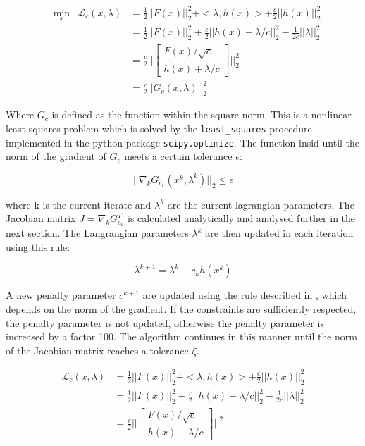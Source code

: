 \begin{equation}
	\begin{aligned}
	 & \underset{x}{\text{min}} & \mathcal{L}_c(x,\lambda) 
	     &= \frac{1}{2} ||F(x)||^2_2 + <\lambda,h(x)> + \frac{c}{2} || h(x) ||^2_2 \\
	 & & &= \frac{1}{2} ||F(x)||^2_2 + \frac{c}{2} ||h(x) + \lambda/c ||^2_2 - \frac{1}{2c} ||\lambda||^2_2 \\
	 & & &= \frac{c}{2} \Big|\Big|
		\begin{bmatrix}
			F(x)/\sqrt{c} \\
			h(x) + \lambda/c
		\end{bmatrix} \Big|\Big|^2_2 \\
	 & & &= \frac{c}{2} ||G_c(x,\lambda)||^2_2
	\end{aligned}
	\label{loss}
\end{equation}

Where $G_c$ is defined as the function within the square norm. This is a nonlinear least squares problem which is solved by the \texttt{least\_squares} procedure implemented in the python package \texttt{scipy.optimize}. The function insid until the norm of the gradient of $G_c$ meets a certain tolerance $\epsilon$:

\begin{equation}
|| \nabla_kG_{c_k}(x^k,\lambda^k)||_2 \leq \epsilon
\end{equation}
 
where k is the current iterate and $\lambda^k$ are the current lagrangian parameters. The Jacobian matrix $J = \nabla_kG_{c_k}^T$ is calculated analytically and analysed further in the next section. The Langrangian parameters $\lambda^k$ are then updated in each iteration using this rule:

\begin{equation}
\lambda^{k+1} = \lambda^k + c_kh(x^k)
\end{equation}

A new penalty parameter $c^{k+1}$ are updated using the rule described in \cite{}, which depends on the norm of the gradient. If the constraints are sufficiently respected, the penalty parameter is not updated, otherwise the penalty parameter is increased by a factor 100. The algorithm continues in this manner until the norm of the Jacobian matrix reaches a tolerance $\zeta$.


\begin{equation}
	\begin{aligned}
		\mathcal{L}_c(x,\lambda)
		&= \frac{1}{2} ||F(x)||^2_2 + <\lambda,h(x)> + \frac{c}{2} || h(x) ||^2_2 \\
		&= \frac{1}{2} ||F(x)||^2_2 + \frac{c}{2} ||h(x) + \lambda/c ||^2_2 - \frac{1}{2c} ||\lambda||^2_2 \\
		&= \frac{c}{2} \Big|\Big|
		\begin{bmatrix}
			F(x)/\sqrt{c} \\
			h(x) + \lambda/c
		\end{bmatrix} \Big|\Big|^2
	\end{aligned}
	\label{loss}
\end{equation}

